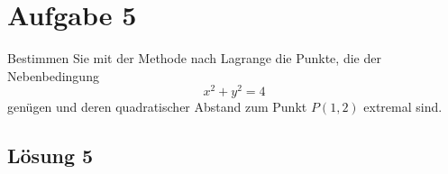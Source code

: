 \documentclass[main.tex]{subfiles}
\begin{document}
\section{Aufgabe 5}
Bestimmen Sie mit der Methode nach Lagrange die Punkte, die der Nebenbedingung
$$
    x^2 + y^2 = 4
$$
genügen und deren quadratischer Abstand zum Punkt $P(1,2)$ extremal sind.

\subsection{Lösung 5}
\end{document}
